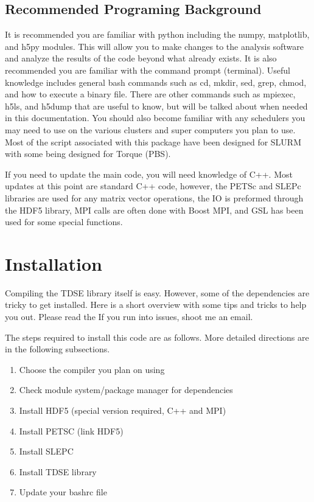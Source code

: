 \documentclass{article}
\begin{document}
\subsection{Recommended Programing Background} %
\label{sub:recommended_programing_background}
It is recommended you are familiar with python including the numpy, matplotlib, and h5py modules. This will allow you to make changes to the analysis software and analyze the results of the code beyond what already exists. It is also recommended you are familiar with the command prompt (terminal). Useful knowledge includes general bash commands such as cd, mkdir, sed, grep, chmod, and how to execute a binary file. There are other commands such as mpiexec, h5ls, and h5dump that are useful to know, but will be talked about when needed in this documentation. You should also become familiar with any schedulers you may need to use on the various clusters and super computers you plan to use. Most of the script associated with this package have been designed for SLURM with some being designed for Torque (PBS).

If you need to update the main code, you will need knowledge of C++. Most updates at this point are standard C++ code, however, the PETSc and SLEPc libraries are used for any matrix vector operations, the IO is preformed through the HDF5 library, MPI calls are often done with Boost MPI, and GSL has been used for some special functions.

\section{Installation} %
\label{sec:installation}
Compiling the TDSE library itself is easy. However, some of the dependencies are tricky to get installed. Here is a short overview with some tips and tricks to help you out. Please read the  If you run into issues, shoot me an email.

The steps required to install this code are as follows. More detailed directions are in the following subsections.
\begin{enumerate}
  \item Choose the compiler you plan on using
  \item Check module system/package manager for dependencies
  \item Install HDF5 (special version required, C++ and MPI)
  \item Install PETSC (link HDF5)
  \item Install SLEPC
  \item Install TDSE library
  \item Update your bashrc file
\end{enumerate}
\end{document}
